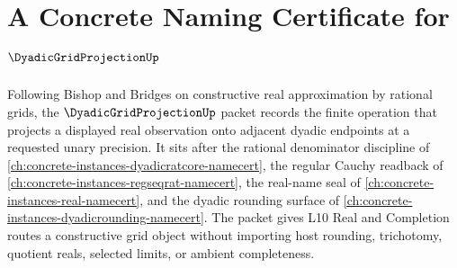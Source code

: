 \chapter{A Concrete Naming Certificate for $\DyadicGridProjectionUp$}
\label{ch:concrete-instances-dyadic-grid-projection-namecert}

Following Bishop and Bridges on constructive real approximation by rational grids, the $\DyadicGridProjectionUp$ packet records the finite operation that projects a displayed real observation onto adjacent dyadic endpoints at a requested unary precision. It sits after the rational denominator discipline of \autoref{ch:concrete-instances-dyadicratcore-namecert}, the regular Cauchy readback of \autoref{ch:concrete-instances-regseqrat-namecert}, the real-name seal of \autoref{ch:concrete-instances-real-namecert}, and the dyadic rounding surface of \autoref{ch:concrete-instances-dyadicrounding-namecert}. The packet gives L10 Real and Completion routes a constructive grid object without importing host rounding, trichotomy, quotient reals, selected limits, or ambient completeness.

